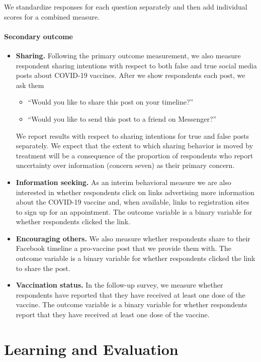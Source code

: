 \documentclass[letterpaper, 12pt, parskip=full,DIV=10]{scrartcl}
\begin{document}
We standardize responses for each question separately and then add individual scores for a combined measure. 

\paragraph{Secondary outcome}
\begin{itemize}
\item \textbf{Sharing.} Following the primary outcome measurement, we also measure respondent sharing intentions with respect to both false and true social media posts about COVID-19 vaccines. After we show respondents each post, we ask them 
\begin{itemize}
  \item ``Would you like to share this post on your timeline?''
  \item ``Would you like to send this post to a friend on Messenger?''
\end{itemize}
We report results with respect to sharing intentions for true and false posts separately. We expect that the extent to which sharing behavior is moved by treatment will be a consequence of the proportion of respondents who report uncertainty over information (concern seven) as their primary concern. 
\item \textbf{Information seeking.} As an interim behavioral measure we are also interested in whether respondents click on links advertising more information about the COVID-19 vaccine and, when available, links to registration sites to sign up for an appointment. The outcome variable is a binary variable for whether respondents clicked the link. 
\item \textbf{Encouraging others.} We also measure whether respondents share to their Facebook timeline a pro-vaccine post that we provide them with. The outcome variable is a binary variable for whether respondents clicked the link to share the post. 
\item \textbf{Vaccination status.} In the follow-up survey, we measure whether respondents have reported that they have received at least one dose of the vaccine. The outcome variable is a binary variable for whether respondents report that they have received at least one dose of the vaccine. 
\end{itemize}

\section{Learning and Evaluation}
\end{document}
